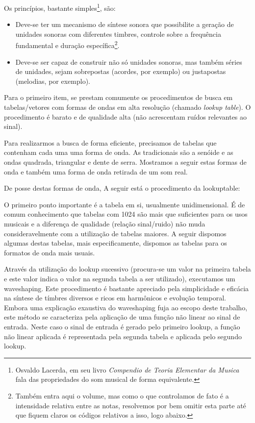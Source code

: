 Os princípios, bastante simples\footnote{Osvaldo Lacerda, em seu livro \emph{Compendio de Teoria Elementar da Musica} fala das propriedades do som musical de forma equivalente.}, são:
\begin{itemize}
  \item Deve-se ter um mecanismo de síntese sonora que
possibilite a geração de unidades sonoras com diferentes timbres, controle sobre a frequência fundamental e duração específica\footnote{Também entra aqui o volume, mas como o que controlamos de fato é a intensidade relativa entre as notas, resolvemos por bem omitir
esta parte até que fiquem claros os códigos relativos a isso, logo abaixo.}.
  \item Deve-se ser capaz de construir não só unidades sonoras, mas também séries de unidades, sejam sobrepostas (acordes, por exemplo)
  ou justapostas (melodias, por exemplo).
\end{itemize}

Para o primeiro item, se prestam comumente os procedimentos de busca em tabelas/vetores com formas
de ondas em alta resolução (chamado \emph{lookup table}). O procedimento é barato e de qualidade alta
(não acrescentam ruídos relevantes ao sinal).

Para realizarmos a busca de forma eficiente, precisamos de tabelas que contenham cada uma
uma forma de onda. As tradicionais são a senóide e as ondas quadrada, triangular e dente de serra.
Mostramos a seguir estas formas de onda e também uma forma de onda retirada de um som real.

De posse destas formas de onda, A seguir está o procedimento da lookuptable:


O primeiro ponto importante é a tabela em si, usualmente unidimensional. É de comum conhecimento que
tabelas com 1024 são mais que suficientes para os usos musicais e a diferença
de qualidade (relação sinal/ruido) não muda consideravelmente com a utilização
de tabelas maiores. A seguir dispomos algumas destas tabelas, mais 
especificamente, dispomos as tabelas para os formatos de onda mais usuais. 


Através da utilização do lookup sucessivo (procura-se um valor na primeira tabela
e este valor indica o valor na segunda tabela a ser utilizado), executamos
um waveshaping. Este procedimento é bastante apreciado pela simplicidade e eficácia
na síntese de tímbres diversos e ricos em harmônicos e evolução temporal. Embora
uma explicação exaustiva do waveshaping fuja ao escopo deste trabalho, este
método se caracteriza pela aplicação de uma função não linear ao sinal de entrada.
Neste caso o sinal de entrada é gerado pelo primeiro lookup, a função não linear aplicada
é representada pela segunda tabela e aplicada pelo segundo lookup.

